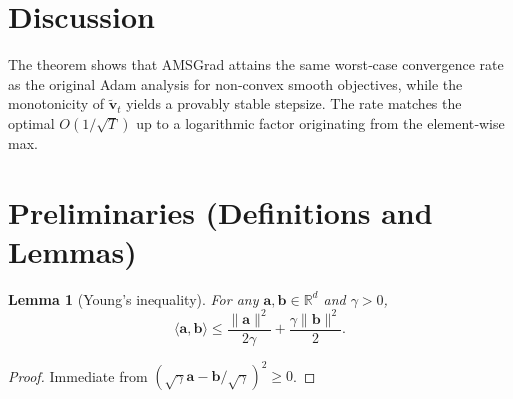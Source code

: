 \documentclass{article}
\newtheorem{lemma}{Lemma}
\newcommand{\R}{\mathbb{R}}
\begin{document}
\section*{Discussion}
The theorem shows that AMSGrad attains the same worst‑case convergence
rate as the original Adam analysis for non‑convex smooth objectives,
while the monotonicity of $\tilde{\bm v}_{t}$ yields a provably
stable stepsize. The rate matches the optimal $O(1/\sqrt{T})$ up to a
logarithmic factor originating from the element‑wise max.

\newpage

\section*{Preliminaries (Definitions and Lemmas)}
\begin{lemma}[Young’s inequality]\label{lem:young}
For any $\bm{a},\bm{b}\in\R^{d}$ and $\gamma>0$,
\[
\langle\bm{a},\bm{b}\rangle\le\frac{\|\bm{a}\|^{2}}{2\gamma}
+\frac{\gamma\|\bm{b}\|^{2}}{2}.
\tag{10}
\]
\end{lemma}
\begin{proof}
Immediate from $(\sqrt{\gamma}\bm{a}-\bm{b}/\sqrt{\gamma})^{2}\ge0$.
\end{proof}
\end{document}
